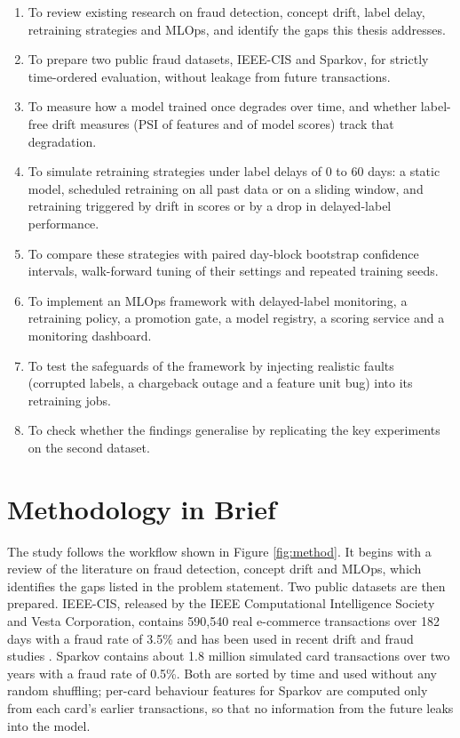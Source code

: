 \begin{enumerate}
  \item To review existing research on fraud detection, concept drift, label delay, retraining strategies and MLOps, and identify the gaps this thesis addresses.
  \item To prepare two public fraud datasets, IEEE-CIS and Sparkov, for strictly time-ordered evaluation, without leakage from future transactions.
  \item To measure how a model trained once degrades over time, and whether label-free drift measures (PSI of features and of model scores) track that degradation.
  \item To simulate retraining strategies under label delays of 0 to 60 days: a static model, scheduled retraining on all past data or on a sliding window, and retraining triggered by drift in scores or by a drop in delayed-label performance.
  \item To compare these strategies with paired day-block bootstrap confidence intervals, walk-forward tuning of their settings and repeated training seeds.
  \item To implement an MLOps framework with delayed-label monitoring, a retraining policy, a promotion gate, a model registry, a scoring service and a monitoring dashboard.
  \item To test the safeguards of the framework by injecting realistic faults (corrupted labels, a chargeback outage and a feature unit bug) into its retraining jobs.
  \item To check whether the findings generalise by replicating the key experiments on the second dataset.
\end{enumerate}

\section{Methodology in Brief}

The study follows the workflow shown in Figure \ref{fig:method}. It begins with a review of the literature on fraud detection, concept drift and MLOps, which identifies the gaps listed in the problem statement. Two public datasets are then prepared. IEEE-CIS, released by the IEEE Computational Intelligence Society and Vesta Corporation, contains 590,540 real e-commerce transactions over 182 days with a fraud rate of 3.5\% and has been used in recent drift and fraud studies \cite{menezes2025,uddin2026}. Sparkov contains about 1.8 million simulated card transactions over two years with a fraud rate of 0.5\%. Both are sorted by time and used without any random shuffling; per-card behaviour features for Sparkov are computed only from each card's earlier transactions, so that no information from the future leaks into the model.

